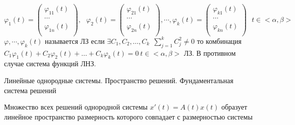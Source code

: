 \begin{define}
  $$
  \varphi_1 (t) =
  \left(
  \begin{array}{c}
    \varphi_{11}(t) \\
    \cdots \\
    \varphi_{1n}(t) \\
  \end{array}
  \right),~~~
  \varphi_2 (t) =
  \left(
  \begin{array}{c}
    \varphi_{21}(t) \\
    \cdots \\
    \varphi_{2n}(t) \\
  \end{array}
  \right), \cdots,
  \varphi_k (t) =
  \left(
  \begin{array}{c}
    \varphi_{k1}(t) \\
    \cdots \\
    \varphi_{kn}(t) \\
  \end{array}
  \right) ~~~ t \in <\alpha, \beta>
  $$
  $\varphi, \cdots, \varphi_k(t)$ называется ЛЗ если $\exists C_1, C_2, \ldots,
  C_k ~~ \sum_{j=1}^k C_j^2 \not= 0$ то комбинация $C_1\varphi_1(t) +
  C_2\varphi_2(t) + \ldots + C_k\varphi_k(t) = 0 ~ t \in <\alpha, \beta>$ ЛЗ. В
  противном случае система функций ЛНЗ.
\end{define}

\begin{title}[\Large]
  Линейные однородные системы. Пространство решений. Фундаментальная система
  решений
\end{title}

\begin{theorem}
  Множество всех решений однородной системы $x'(t) = A(t)x(t)$ образует
  линейное пространство размерность которого совпадает с размерностью системы
\end{theorem}

